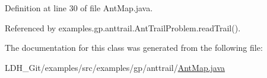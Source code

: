 Definition at line 30 of file Ant\-Map.\-java.



Referenced by examples.\-gp.\-anttrail.\-Ant\-Trail\-Problem.\-read\-Trail().



The documentation for this class was generated from the following file\-:\begin{DoxyCompactItemize}
\item 
L\-D\-H\-\_\-\-Git/examples/src/examples/gp/anttrail/\hyperlink{anttrail_2_ant_map_8java}{Ant\-Map.\-java}\end{DoxyCompactItemize}
